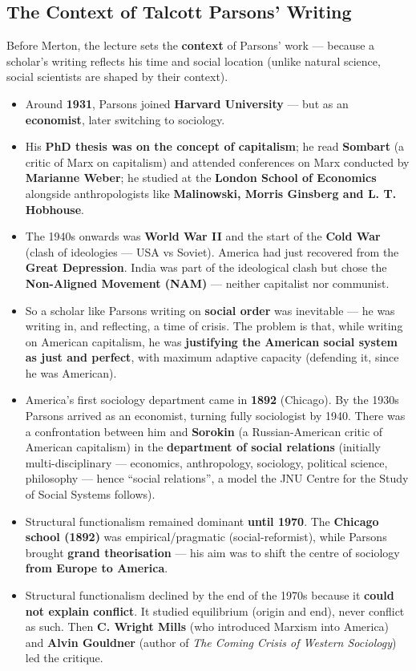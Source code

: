 \sectiondivider

\subsection{The Context of Talcott Parsons' Writing}

Before Merton, the lecture sets the \textbf{context} of Parsons' work --- because a scholar's writing reflects his time and social location (unlike natural science, social scientists are shaped by their context).

\begin{DataFact}
\begin{itemize}
\item Around \textbf{1931}, Parsons joined \textbf{Harvard University} --- but as an \textbf{economist}, later switching to sociology.
\item His \textbf{PhD thesis was on the concept of capitalism}; he read \textbf{Sombart} (a critic of Marx on capitalism) and attended conferences on Marx conducted by \textbf{Marianne Weber}; he studied at the \textbf{London School of Economics} alongside anthropologists like \textbf{Malinowski, Morris Ginsberg and L. T. Hobhouse}.
\item The 1940s onwards was \textbf{World War II} and the start of the \textbf{Cold War} (clash of ideologies --- USA vs Soviet). America had just recovered from the \textbf{Great Depression}. India was part of the ideological clash but chose the \textbf{Non-Aligned Movement (NAM)} --- neither capitalist nor communist.
\item So a scholar like Parsons writing on \textbf{social order} was inevitable --- he was writing in, and reflecting, a time of crisis. The problem is that, while writing on American capitalism, he was \textbf{justifying the American social system as just and perfect}, with maximum adaptive capacity (defending it, since he was American).
\item America's first sociology department came in \textbf{1892} (Chicago). By the 1930s Parsons arrived as an economist, turning fully sociologist by 1940. There was a confrontation between him and \textbf{Sorokin} (a Russian-American critic of American capitalism) in the \textbf{department of social relations} (initially multi-disciplinary --- economics, anthropology, sociology, political science, philosophy --- hence ``social relations'', a model the JNU Centre for the Study of Social Systems follows).
\item Structural functionalism remained dominant \textbf{until 1970}. The \textbf{Chicago school (1892)} was empirical/pragmatic (social-reformist), while Parsons brought \textbf{grand theorisation} --- his aim was to shift the centre of sociology \textbf{from Europe to America}.
\item Structural functionalism declined by the end of the 1970s because it \textbf{could not explain conflict}. It studied equilibrium (origin and end), never conflict as such. Then \textbf{C. Wright Mills} (who introduced Marxism into America) and \textbf{Alvin Gouldner} (author of \textit{The Coming Crisis of Western Sociology}) led the critique.
\end{itemize}
\end{DataFact}

